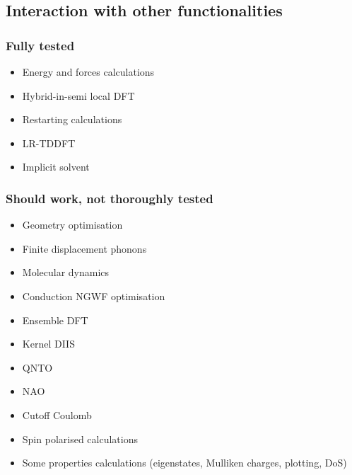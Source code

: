 \documentclass[letterpaper,10pt,english]{sphinxmanual}
\begin{document}
\subsection{Interaction with other functionalities}
\label{\detokenize{EMFT_in_ONETEP:interaction-with-other-functionalities}}

\subsubsection{Fully tested}
\label{\detokenize{EMFT_in_ONETEP:fully-tested}}\begin{itemize}
\item {} 
Energy and forces calculations

\item {} 
Hybrid-in-semi local DFT

\item {} 
Restarting calculations

\item {} 
LR-TDDFT

\item {} 
Implicit solvent

\end{itemize}


\subsubsection{Should work, not thoroughly tested}
\label{\detokenize{EMFT_in_ONETEP:should-work-not-thoroughly-tested}}\begin{itemize}
\item {} 
Geometry optimisation

\item {} 
Finite displacement phonons

\item {} 
Molecular dynamics

\item {} 
Conduction NGWF optimisation

\item {} 
Ensemble DFT

\item {} 
Kernel DIIS

\item {} 
QNTO

\item {} 
NAO

\item {} 
Cutoff Coulomb

\item {} 
Spin polarised calculations

\item {} 
Some properties calculations (eigenstates, Mulliken charges,
plotting, DoS)

\end{itemize}
\end{document}
